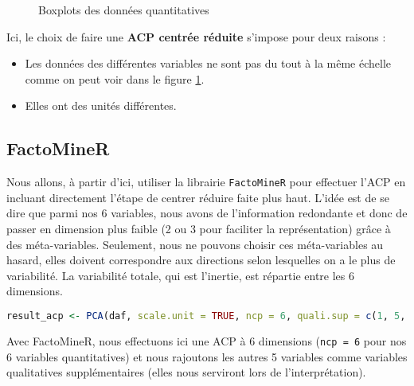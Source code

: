 \documentclass[
  11pt,
  xcolor = usenames,dvipsnames]{article}
\newcommand{\passthrough}[1]{#1}
\providecommand{\tightlist}{%
  \setlength{\itemsep}{0pt}\setlength{\parskip}{0pt}}
\begin{document}
\begin{figure}

{\centering {}

}

\caption{Boxplots des données quantitatives}\label{fig:boxplot-comparison}
\end{figure}

Ici, le choix de faire une \textbf{ACP centrée réduite} s'impose pour deux raisons :

\begin{itemize}
\tightlist
\item
  Les données des différentes variables ne sont pas du tout à la même échelle comme on peut voir dans le figure \ref{fig:boxplot-comparison}.
\item
  Elles ont des unités différentes.
\end{itemize}

\hypertarget{factominer}{%
\subsection{FactoMineR}\label{factominer}}

Nous allons, à partir d'ici, utiliser la librairie \passthrough{\lstinline!FactoMineR!} pour effectuer l'ACP en incluant directement l'étape de centrer réduire faite plus haut.
L'idée est de se dire que parmi nos 6 variables, nous avons de l'information redondante et donc de passer en dimension plus faible
(2 ou 3 pour faciliter la représentation) grâce à des méta-variables. Seulement, nous ne pouvons choisir ces méta-variables au hasard,
elles doivent correspondre aux directions selon lesquelles on a le plus de variabilité. La variabilité totale, qui est l'inertie,
est répartie entre les 6 dimensions.

\begin{lstlisting}[language=R]
result_acp <- PCA(daf, scale.unit = TRUE, ncp = 6, quali.sup = c(1, 5, 6, 9, 11), graph = FALSE)
\end{lstlisting}

Avec FactoMineR, nous effectuons ici une ACP à 6 dimensions (\passthrough{\lstinline!ncp = 6!} pour nos 6 variables quantitatives) et
nous rajoutons les autres 5 variables comme variables qualitatives supplémentaires
(elles nous serviront lors de l'interprétation).
\end{document}
